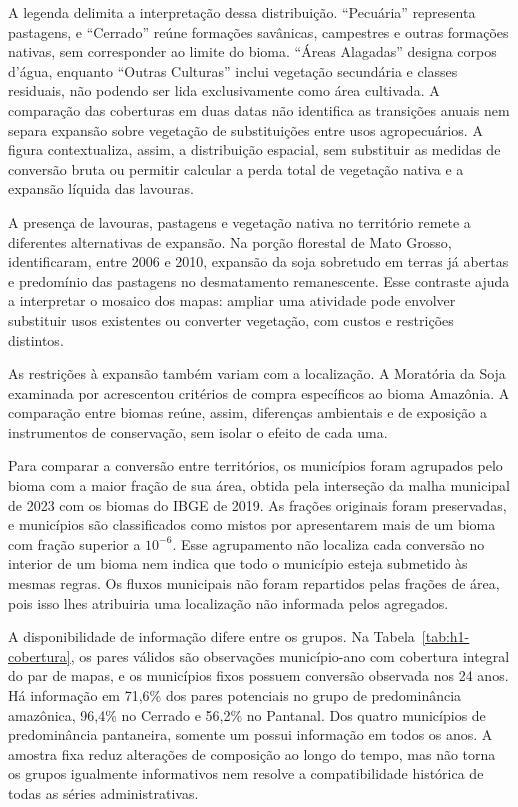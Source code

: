 \FloatBarrier
A legenda delimita a interpretação dessa distribuição. ``Pecuária'' representa pastagens, e ``Cerrado'' reúne formações savânicas, campestres e outras formações nativas, sem corresponder ao limite do bioma. ``Áreas Alagadas'' designa corpos d'água, enquanto ``Outras Culturas'' inclui vegetação secundária e classes residuais, não podendo ser lida exclusivamente como área cultivada. A comparação das coberturas em duas datas não identifica as transições anuais nem separa expansão sobre vegetação de substituições entre usos agropecuários. A figura contextualiza, assim, a distribuição espacial, sem substituir as medidas de conversão bruta ou permitir calcular a perda total de vegetação nativa e a expansão líquida das lavouras.

A presença de lavouras, pastagens e vegetação nativa no território remete a diferentes alternativas de expansão. Na porção florestal de Mato Grosso,  identificaram, entre 2006 e 2010, expansão da soja sobretudo em terras já abertas e predomínio das pastagens no desmatamento remanescente. Esse contraste ajuda a interpretar o mosaico dos mapas: ampliar uma atividade pode envolver substituir usos existentes ou converter vegetação, com custos e restrições distintos.

As restrições à expansão também variam com a localização. A Moratória da Soja examinada por  acrescentou critérios de compra específicos ao bioma Amazônia. A comparação entre biomas reúne, assim, diferenças ambientais e de exposição a instrumentos de conservação, sem isolar o efeito de cada uma.

Para comparar a conversão entre territórios, os municípios foram agrupados pelo bioma com a maior fração de sua área, obtida pela interseção da malha municipal de 2023 com os biomas do IBGE de 2019. As frações originais foram preservadas, e \Hmixed{} municípios são classificados como mistos por apresentarem mais de um bioma com fração superior a $10^{-6}$. Esse agrupamento não localiza cada conversão no interior de um bioma nem indica que todo o município esteja submetido às mesmas regras. Os fluxos municipais não foram repartidos pelas frações de área, pois isso lhes atribuiria uma localização não informada pelos agregados.

A disponibilidade de informação difere entre os grupos. Na Tabela~\ref{tab:h1-cobertura}, os pares válidos são observações município-ano com cobertura integral do par de mapas, e os municípios fixos possuem conversão observada nos 24 anos. Há informação em 71,6\% dos pares potenciais no grupo de predominância amazônica, 96,4\% no Cerrado e 56,2\% no Pantanal. Dos quatro municípios de predominância pantaneira, somente um possui informação em todos os anos. A amostra fixa reduz alterações de composição ao longo do tempo, mas não torna os grupos igualmente informativos nem resolve a compatibilidade histórica de todas as séries administrativas.

